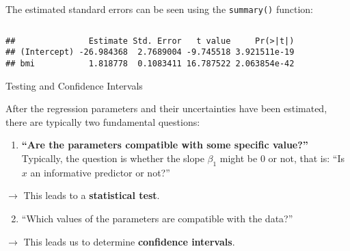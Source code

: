\documentclass[10pt,ignorenonframetext,]{beamer}
\newenvironment{Shaded}{\begin{snugshade}}{\end{snugshade}}
\newcommand{\KeywordTok}[1]{\textcolor[rgb]{0.13,0.29,0.53}{\textbf{#1}}}
\newcommand{\NormalTok}[1]{#1}
\newcommand{\OperatorTok}[1]{\textcolor[rgb]{0.81,0.36,0.00}{\textbf{#1}}}
\providecommand{\tightlist}{%
  \setlength{\itemsep}{0pt}\setlength{\parskip}{0pt}}
\begin{document}
\begin{frame}[fragile]

The estimated standard errors can be seen using the \texttt{summary()}
function:

\(~\)

\scriptsize

\begin{Shaded}
\end{Shaded}

\begin{verbatim}
##               Estimate Std. Error   t value     Pr(>|t|)
## (Intercept) -26.984368  2.7689004 -9.745518 3.921511e-19
## bmi           1.818778  0.1083411 16.787522 2.063854e-42
\end{verbatim}

\end{frame}

\begin{frame}{Testing and Confidence Intervals}
\protect\hypertarget{testing-and-confidence-intervals}{}

After the regression parameters and their uncertainties have been
estimated, there are typically two fundamental questions:

\vspace{4mm}

\begin{enumerate}
\tightlist
\item
  \textbf{``Are the parameters compatible with some specific value?''}
  Typically, the question is whether the slope \(\beta_1\) might be 0 or
  not, that is: ``Is \(x\) an informative predictor or not?''
\end{enumerate}

\hspace{4mm} \(\rightarrow\) This leads to a \textbf{statistical test}.

\vspace{6mm}

\begin{enumerate}
\setcounter{enumi}{1}
\tightlist
\item
  ``Which values of the parameters are compatible with the data?''
\end{enumerate}

\hspace{4mm} \(\rightarrow\) This leads us to determine
\textbf{confidence intervals}.

\end{frame}
\end{document}
